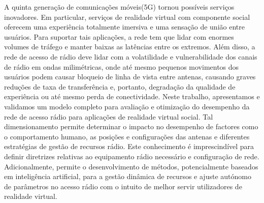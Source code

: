 \begin{resumo}



A quinta generação de comunicações móveis(5G) tornou possíveis serviços inovadores. Em particular, serviços de realidade virtual com componente social oferecem uma experiência totalmente imersiva e uma sensação de união entre usuários. Para suportar tais aplicações, a rede tem que lidar com enormes volumes de tráfego e manter baixas as latências entre os extremos. Além disso, a rede de acesso de rádio deve lidar com a volatilidade e vulnerabilidade dos canais de rádio em ondas milimétricas, onde até mesmo pequenos movimentos dos usuários podem causar bloqueio de linha de vista entre antenas, causando graves reduções de taxa de transferência e, portanto, degradação da qualidade de experiência ou até mesmo perda de conectividade. Neste trabalho, apresentamos e validamos um modelo completo para avaliação e otimização do desempenho da rede de acesso rádio para aplicações de realidade virtual social. Tal dimensionamento permite determinar o impacto no desempenho de factores como o comportamento humano, as posições e configurações das antenas e diferentes estratégias de gestão de recursos rádio. Este conhecimento é imprescindível para definir diretrizes relativas ao equipamento rádio necessário e configuração de rede. Adicionalmente, permite o desenvolvimento de métodos, potencialmente baseados em inteligência artificial, para a gestão dinâmica de recursos e ajuste autónomo de parâmetros no acesso rádio com o intuito de melhor servir utilizadores de realidade virtual.


\end{resumo}
